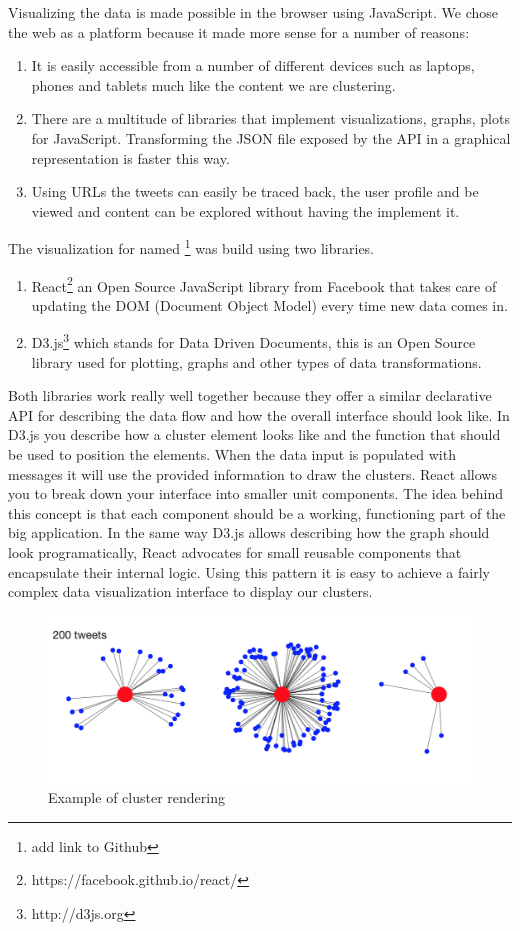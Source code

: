Visualizing the data is made possible in the browser using JavaScript. We chose the web as a platform because it made more sense for a number of reasons:
\begin{enumerate}
	\item It is easily accessible from a number of different devices such as laptops, phones and tablets much like the content we are clustering.
	\item There are a multitude of libraries that implement visualizations, graphs, plots for JavaScript. Transforming the JSON file exposed by the API in a graphical representation is faster this way.
	\item Using URLs the tweets can easily be traced back, the user profile and be viewed and content can be explored without having the implement it.
\end{enumerate}
The visualization for {\project} named \textbf{\frontend}\footnote{add link to Github} was build using two libraries.
\begin{enumerate}
	\item React\footnote{https://facebook.github.io/react/} an Open Source JavaScript library from Facebook that takes care of updating the DOM (Document Object Model) every time new data comes in.
	\item D3.js\footnote{http://d3js.org} which stands for Data Driven Documents, this is an Open Source library used for plotting, graphs and other types of data transformations.
\end{enumerate}
Both libraries work really well together because they offer a similar declarative API for describing the data flow and how the overall interface should look like. In D3.js you describe how a cluster element looks like and the function that should be used to position the elements. When the data input is populated with messages it will use the provided information to draw the clusters.
\newline
React allows you to break down your interface into smaller unit components. The idea behind this concept is that each component should be a working, functioning part of the big application. In the same way D3.js allows describing how the graph should look programatically, React advocates for small reusable components that encapsulate their internal logic. Using this pattern it is easy to achieve a fairly complex data visualization interface to display our clusters.

\begin{figure}[ht!]
\centering
\includegraphics[width=\textwidth,height=\textheight,keepaspectratio]{src/img/clusters.png}
\caption{Example of cluster rendering\label{overflow}}
\end{figure}

